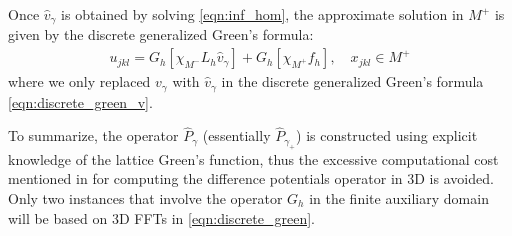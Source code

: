 Once $\hat{v}_\gamma$ is obtained by solving \eqref{eqn:inf_hom}, the approximate solution in $M^+$ is given by the discrete generalized Green's formula:
\begin{align}\label{eqn:discrete_green}
u_{jkl} = G_h[\chi_{M^-}L_h\hat{v}_\gamma]+G_h[\chi_{M^+}f_h],\quad x_{jkl}\in M^+
\end{align}
where we only replaced $v_\gamma$ with $\hat{v}_\gamma$ in the discrete generalized Green's formula \eqref{eqn:discrete_green_v}.

To summarize, the operator $\widehat{P}_\gamma$ (essentially $\widehat{P}_{\gamma_+}$) is constructed using explicit knowledge of the lattice Green's function, thus the excessive computational cost mentioned in \cite{xia2023local} for computing the difference potentials operator in 3D is avoided. Only two instances that involve the operator $G_h$ in the finite auxiliary domain will be based on 3D FFTs in \eqref{eqn:discrete_green}.
